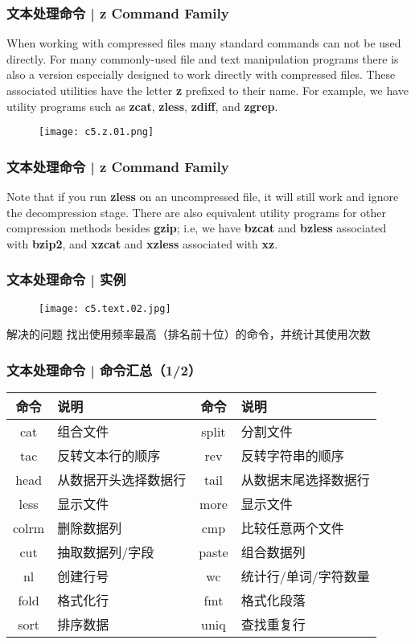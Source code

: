 \begin{frame}
  \frametitle{文本处理命令 | z Command Family}
  When working with compressed files many standard commands can not be used directly. For many commonly-used file and text manipulation programs there is also a version especially designed to work directly with compressed files. These associated utilities have the letter \textbf{z} prefixed to their name. For example, we have utility programs such as \textbf{zcat}, \textbf{zless}, \textbf{zdiff}, and \textbf{zgrep}.\\
  \begin{figure}
    \centering
    \texttt{[image: c5.z.01.png]}
  \end{figure}
\end{frame}

\begin{frame}
  \frametitle{文本处理命令 | z Command Family}
  Note that if you run \textbf{zless} on an uncompressed file, it will still work and ignore the decompression stage. There are also equivalent utility programs for other compression methods besides \textbf{gzip}; i.e, we have \textbf{bzcat} and \textbf{bzless} associated with \textbf{bzip2}, and \textbf{xzcat} and \textbf{xzless} associated with \textbf{xz}.
\end{frame}

\begin{frame}
  \frametitle{文本处理命令 | \alert{实例}}
  \begin{figure}
    \centering
    \texttt{[image: c5.text.02.jpg]}
  \end{figure}
  \pause
  \begin{block}{解决的问题}
    找出使用频率最高（排名前十位）的命令，并统计其使用次数
  \end{block}
\end{frame}

\begin{frame}
  \frametitle{文本处理命令 | 命令汇总（1/2）}
  \begin{table}
    \centering
    \begin{tabularx}{\textwidth}{cX|cX}
      \hline
      \rowcolor{blue!50}命令 & 说明 & 命令 & 说明\\
      \hline
      cat & 组合文件 & split & 分割文件\\
      tac & 反转文本行的顺序 & rev & 反转字符串的顺序\\
      head & 从数据开头选择数据行 & tail & 从数据末尾选择数据行\\
      less & 显示文件 & more & 显示文件\\
      colrm & 删除数据列 & cmp & 比较任意两个文件\\
      cut & 抽取数据列/字段 & paste & 组合数据列\\
      nl & 创建行号 & wc & 统计行/单词/字符数量\\
      fold & 格式化行 & fmt & 格式化段落\\
      sort & 排序数据 & uniq & 查找重复行\\
      \hline
    \end{tabularx}
  \end{table}
\end{frame}

